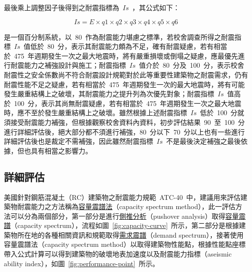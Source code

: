 最後乘上調整因子後得到之耐震指標為~$Is$~，其公式如下：

  \begin{equation}Is = E \times q1 \times q2 \times q3 \times q4 \times q5 \times q6 \end{equation} 

是一個百分制系統，以~80~作為耐震能力堪慮之標準，若校舍調查所得之耐震指標~$Is$~值低於~80~分，表示其耐震能力頗為不足，確有耐震疑慮，若有相當於~475~年週期發生一次之最大地震時，將有嚴重損壞或倒塌之疑慮，應最優先進行耐震能力之補強設計與施工；耐震指標~$Is$~值介於~80~分及~100~分，表示校舍耐震性之安全係數尚不符合耐震設計規範對於此等重要性建築物之耐震需求，仍有耐震性能不足之疑慮，若有相當於~475~年週期發生一次的最大地震時，將有可能發生嚴重結構上之破壞，其耐震能力之提升列為次優先對象；耐震指標~$Is$~值高於~100~分，表示其尚無耐震疑慮，若有相當於~475~年週期發生一次之最大地震時，應不至於發生嚴重結構上之破壞。雖然根據上述耐震指標~$Is$~低於~100~分就須接受耐震能力補強，但根據觀察校舍資料內資料，初步評估結果~90~至~100~分進行詳細評估後，絕大部分都不須進行補強，80~分以下~70~分以上也有一些進行詳細評估後也是裁定不需補強，因此雖然耐震指標~$Is$~不是最後決定補強之最後依據，但也具有相當之影響力。


\subsection{詳細評估}

美國針對鋼筋混凝土（RC）建築物之耐震能力規範~ATC-40\cite{applied1996seismic}~中，建議用來評估建築物耐震能力之方法稱為\underline{容量震譜法}（capacity spectrum method），此一評估方法可以分為兩個部分，第一部分是進行\underline{側推分析}（pushover analysis）取得\underline{容量震譜}（capacity spectrum），流程如圖~\ref{fig:capacity-curve}~所示，第二部分是根據建築物所在地的各種相關資訊和規範取得\underline{需求震譜}（demand spectrum），接著使用容量震譜法（capacity spectrum method）以取得建築物性能點，根據性能點座標帶入公式計算可以得到建築物的破壞地表加速度以及耐震能力指標（aseismic ability index），如圖~\ref{fig:performance-point}~所示。

